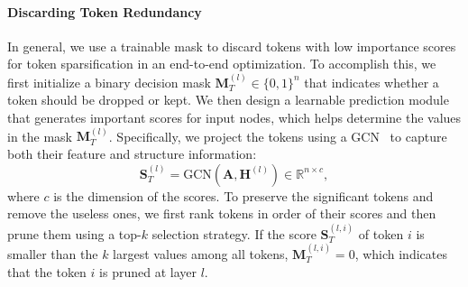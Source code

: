 \documentclass[letterpaper]{article} %
\begin{document}



\paragraph{Discarding Token Redundancy}

In general, we use a trainable mask to discard tokens with low importance scores for token sparsification in an end-to-end optimization. To accomplish this, we first initialize a binary decision mask  $\mathbf{M}_{T}^{(l)} \in \{0, 1\}^{n}$ that indicates whether a token should be dropped or kept. We then design a learnable prediction module that generates important scores for input nodes, which helps determine the values in the mask $\mathbf{M}_{T}^{(l)}$. Specifically, we project the tokens using a GCN~\cite{gcn} to capture both their feature and structure information:
\begin{equation}
\mathbf{S}_{T}^{(l)}  = \text{GCN} (\mathbf{A}, \mathbf{H}^{(l)}) \in \mathbb{R}^{n \times c},
\end{equation}
where $c$ is the dimension of the scores. To preserve the significant tokens and remove the useless ones, we first rank tokens in order of their scores and then prune them using a top-$k$ selection strategy. If the score $\mathbf{S}_{T}^{(l,i)}$ of token $i$ is smaller than the $k$ largest values among all tokens, $\mathbf{M}^{(l,i)}_{T}= 0$, which indicates that the token $i$ is pruned at layer $l$. 
\end{document}
